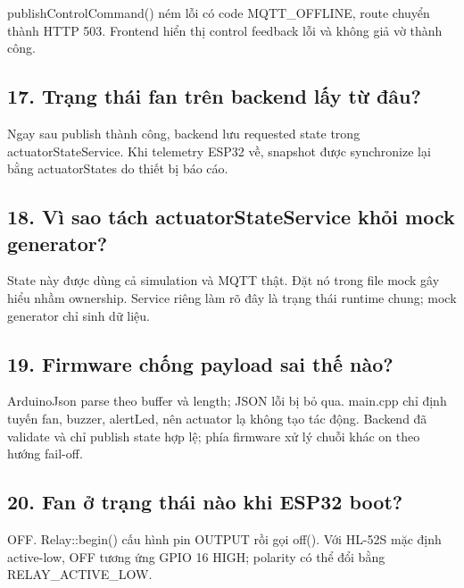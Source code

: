\documentclass[11pt,oneside,openany]{book}
\renewcommand{\texttt}[1]{{\ttfamily\small #1}}
\begin{document}
\texttt{publishControlCommand()} ném lỗi có code \texttt{MQTT\_OFFLINE},
route chuyển thành HTTP 503. Frontend hiển thị control feedback lỗi và
không giả vờ thành công.

\subsection{17. Trạng thái fan trên backend lấy từ
đâu?}\label{17-trux1ea1ng-thuxe1i-fan-truxean-backend-lux1ea5y-tux1eeb-ux111uxe2u}

Ngay sau publish thành công, backend lưu requested state trong
\texttt{actuatorStateService}. Khi telemetry ESP32 về, snapshot được
synchronize lại bằng \texttt{actuatorStates} do thiết bị báo cáo.

\subsection{\texorpdfstring{18. Vì sao tách
\texttt{actuatorStateService} khỏi mock
generator?}{18. Vì sao tách actuatorStateService khỏi mock generator?}}\label{18-vuxec-sao-tuxe1ch-actuatorstateservice-khux1ecfi-mock-generator}

State này được dùng cả simulation và MQTT thật. Đặt nó trong file mock
gây hiểu nhầm ownership. Service riêng làm rõ đây là trạng thái runtime
chung; mock generator chỉ sinh dữ liệu.

\subsection{19. Firmware chống payload sai thế
nào?}\label{19-firmware-chux1ed1ng-payload-sai-thux1ebf-nuxe0o}

ArduinoJson parse theo buffer và length; JSON lỗi bị bỏ qua.
\texttt{main.cpp} chỉ định tuyến \texttt{fan}, \texttt{buzzer},
\texttt{alertLed}, nên actuator lạ không tạo tác động. Backend đã
validate và chỉ publish state hợp lệ; phía firmware xử lý chuỗi khác
\texttt{on} theo hướng fail-off.

\subsection{20. Fan ở trạng thái nào khi ESP32
boot?}\label{20-fan-ux1edf-trux1ea1ng-thuxe1i-nuxe0o-khi-esp32-boot}

OFF. \texttt{Relay::begin()} cấu hình pin OUTPUT rồi gọi \texttt{off()}.
Với HL-52S mặc định active-low, OFF tương ứng GPIO 16 HIGH; polarity có
thể đổi bằng \texttt{RELAY\_ACTIVE\_LOW}.
\end{document}

